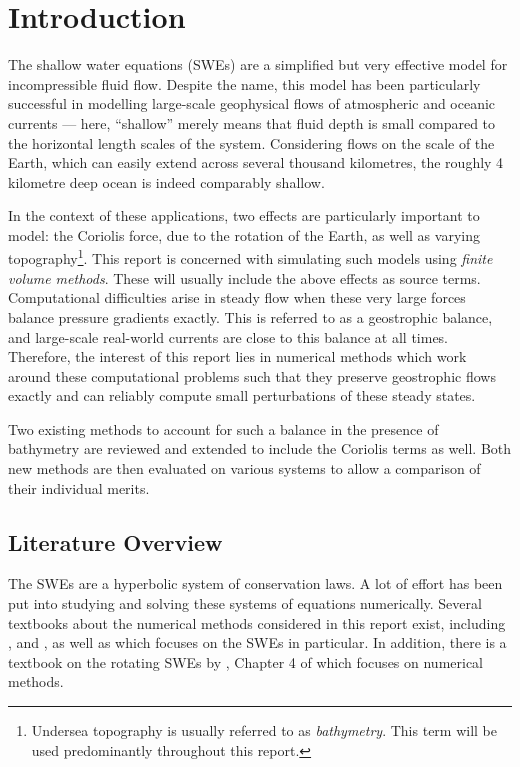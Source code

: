 \chapter{Introduction}
\label{ch:introduction}

The shallow water equations (SWEs) are a simplified but very effective model for incompressible fluid flow. Despite the name, this model has been particularly successful in modelling large-scale geophysical flows of atmospheric and oceanic currents --- here, ``shallow'' merely means that fluid depth is small compared to the horizontal length scales of the system. Considering flows on the scale of the Earth, which can easily extend across several thousand kilometres, the roughly 4 kilometre deep ocean is indeed comparably shallow.

In the context of these applications, two effects are particularly important to model: the Coriolis force, due to the rotation of the Earth, as well as varying topography\footnote{Undersea topography is usually referred to as \emph{bathymetry}. This term will be used predominantly throughout this report.}. This report is concerned with simulating such models using \emph{finite volume methods}. These will usually include the above effects as source terms. Computational difficulties arise in steady flow when these very large forces balance pressure gradients exactly. This is referred to as a geostrophic balance, and large-scale real-world currents are close to this balance at all times. Therefore, the interest of this report lies in numerical methods which work around these computational problems such that they preserve geostrophic flows exactly and can reliably compute small perturbations of these steady states.

Two existing methods to account for such a balance in the presence of bathymetry are reviewed and extended to include the Coriolis terms as well. Both new methods are then evaluated on various systems to allow a comparison of their individual merits.

\section{Literature Overview}

The SWEs are a hyperbolic system of conservation laws. A lot of effort has been put into studying and solving these systems of equations numerically. Several textbooks about the numerical methods considered in this report exist, including \citet{leveque1992numerical}, \citet{toro1999riemann} and \citet{leveque2002finite}, as well as \citet{toro2001shock} which focuses on the SWEs in particular. In addition, there is a textbook on the rotating SWEs by \citet{zeitlin2007nonlinear}, Chapter 4 of which focuses on numerical methods.

